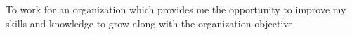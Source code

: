 
\begin{cvparagraph}

To work for an organization which provides me the opportunity to improve my skills and knowledge to grow along with the organization objective.
\end{cvparagraph}
